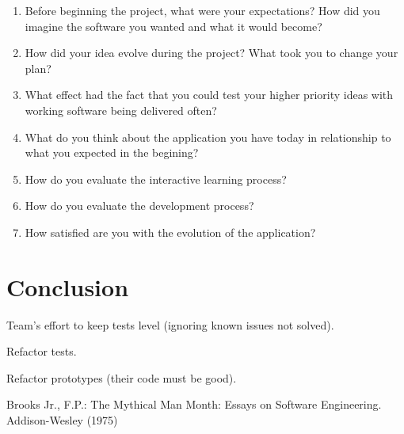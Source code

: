 \documentclass[lnbip]{svmultln}
\begin{document}
\begin{enumerate}
\item Before beginning the project, what were your expectations? How did you imagine the software you wanted and what it would become?
\item How did your idea evolve during the project? What took you to change your plan?
\item What effect had the fact that you could test your higher priority ideas with working software being delivered often?
\item What do you think about the application you have today in relationship to what you expected in the begining?
\item How do you evaluate the interactive learning process?
\item How do you evaluate the development process?
\item How satisfied are you with the evolution of the application?
\end{enumerate}

\section{Conclusion}
\label{sec:conclusion}

Team's effort to keep tests level (ignoring known issues not solved).

Refactor tests.

Refactor prototypes (their code must be good).



%
%
\begin{thebibliography}{5}

 Brooks Jr., F.P.: The Mythical Man Month: Essays
  on Software Engineering. Addison-Wesley (1975)





\end{thebibliography}
%
\end{document}
